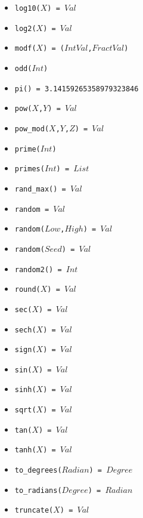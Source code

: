 \documentclass[10pt]{article}
\begin{document}
\begin{multicols}{2}
\begin{scriptsize}
\begin{itemize}
   \item \texttt{log10($X$) = $Val$}
   \item \texttt{log2($X$) = $Val$}
   \item \texttt{modf($X$) = ($IntVal$,$FractVal$)}
   \item \texttt{odd($Int$)}
   \item \texttt{pi() = 3.14159265358979323846}
   \item \texttt{pow($X$,$Y$) = $Val$}
   \item \texttt{pow\_mod($X$,$Y$,$Z$) = $Val$}
   \item \texttt{prime($Int$)}
   \item \texttt{primes($Int$) = $List$}
   \item \texttt{rand\_max() = $Val$}
   \item \texttt{random = $Val$}
   \item \texttt{random($Low$,$High$) = $Val$}
   \item \texttt{random($Seed$) = $Val$}
   \item \texttt{random2() = $Int$}
   \item \texttt{round($X$) = $Val$}
   \item \texttt{sec($X$) = $Val$}
   \item \texttt{sech($X$) = $Val$}
   \item \texttt{sign($X$) = $Val$}
   \item \texttt{sin($X$) = $Val$}
   \item \texttt{sinh($X$) = $Val$}
   \item \texttt{sqrt($X$) = $Val$}
   \item \texttt{tan($X$) = $Val$}
   \item \texttt{tanh($X$) = $Val$}
   \item \texttt{to\_degrees($Radian$) = $Degree$}
   \item \texttt{to\_radians($Degree$) = $Radian$}
   \item \texttt{truncate($X$) = $Val$}

\end{itemize}
\end{scriptsize}
\end{multicols}
\end{document}
